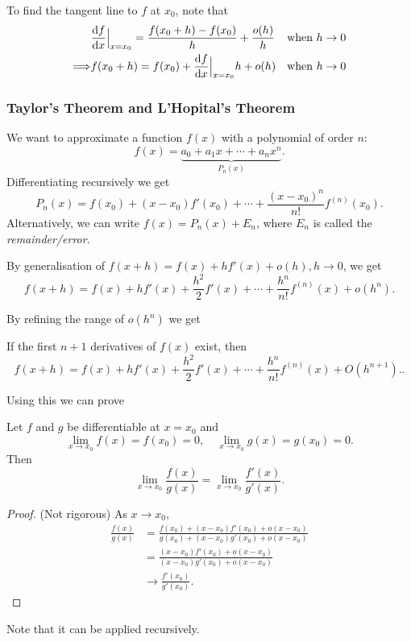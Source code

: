 \documentclass[a4paper]{article}
\begin{document}
    To find the tangent line to $f$ at $x_0$, note that 
    \[
        \begin{aligned}
             & \frac{\mathrm{d}f}{\mathrm{d}x}\Big|_{x=x_0} = \frac{f(x_0+h)-f(x_0)}{h}+ \frac{o(h)}{h} & \text{when $ h \to 0$} \\
             \Longrightarrow & f(x_0+h) = f(x_0)+\frac{\mathrm{d}f}{\mathrm{d}x}\Big|_{x=x_0} h + o(h)& \text{when $ h \to 0$} \\
        \end{aligned}
    \]
    \subsubsection{Taylor's Theorem and L'Hopital's Theorem}
    We want to approximate a function $f(x)$ with a polynomial of order $n$:
    \[
        f(x) = \underbrace{a_0+a_1x+\cdots+a_nx^n}_{P_n(x)}
    .\]
    Differentiating recursively we get 
    \begin{equation}\label{eq:taylor_series}
        P_n(x) = f(x_0)+(x-x_0)f'(x_0)+\cdots+\frac{(x-x_0)^n}{n!}f^{(n)}(x_0).
    \end{equation}
    Alternatively, we can write $ f(x) = P_n(x)+E_n $, where $E_n$ is called the \textit{remainder/error}.

    By generalisation of $ f(x+h) = f(x) + hf'(x)+o(h), h\to 0 $, we get 
    \begin{equation}\label{eq:taylor_series_with_remainder}
        f(x+h) = f(x)+hf'(x)+\frac{h^2}{2}f'(x)+\cdots+\frac{h^n}{n!}f^{(n)}(x)+o(h^n).
    \end{equation}

    By refining the range of $o(h^n)$ we get
    \begin{theorem}[Taylor]\label{thm:taylor_theorem}
        If the first $n+1$ derivatives of $f(x)$ exist, then 
        \[
            f(x+h) = f(x)+hf'(x)+\frac{h^2}{2}f'(x)+\cdots+\frac{h^n}{n!}f^{(n)}(x)+O(h^{n+1}).
        .\]
    \end{theorem}

    Using this we can prove 
    \begin{theorem}[L'Hopital]\label{thm:L'Hopital}
        Let $f$ and $g$ be differentiable at $x=x_0$ and
        \[
            \lim_{x \to x_0} f(x)=f(x_0)=0, \quad \lim_{x \to x_0} g(x)=g(x_0)=0
        .\]
        Then 
        \[
            \lim_{x \to x_0} \frac{f(x)}{g(x)}=\lim_{x \to x_0} \frac{f'(x)}{g'(x)}.
        \]
    \end{theorem}
    \begin{proof}(Not rigorous)
        As $x\to x_0$, 
        \[
            \begin{aligned}
                 \frac{f(x)}{g(x)} &= \frac{f(x_0)+(x-x_0)f'(x_0)+o(x-x_0)}{g(x_0)+(x-x_0)g'(x_0)+o(x-x_0)}\\
                 &= \frac{(x-x_0)f'(x_0)+o(x-x_0)}{(x-x_0)g'(x_0)+o(x-x_0)}\\
                 &\to \frac{f'(x_0)}{g'(x_0)}.
            \end{aligned}
        \]
    \end{proof}
    Note that it can be applied recursively.
\end{document}
